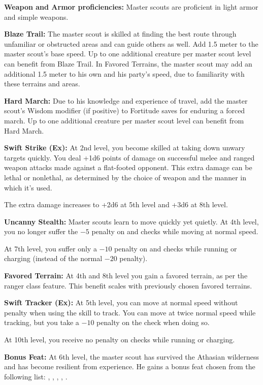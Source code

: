 {
\textbf{Weapon and Armor proficiencies:} Master scouts are proficient in light armor and simple weapons.

\textbf{Blaze Trail:} The master scout is skilled at finding the best route through unfamiliar or obstructed areas and can guide others as well. Add 1.5 meter to the master scout's base speed. Up to one additional creature per master scout level can benefit from Blaze Trail. In Favored Terrains, the master scout may add an additional 1.5 meter to his own and his party's speed, due to familiarity with these terrains and areas.

\textbf{Hard March:} Due to his knowledge and experience of travel, add the master scout's Wisdom modifier (if positive) to Fortitude saves for enduring a forced march. Up to one additional creature per master scout level can benefit from Hard March.

\textbf{Swift Strike (Ex):} At 2nd level, you become skilled at taking down unwary targets quickly. You deal +1d6 points of damage on successful melee and ranged weapon attacks made against a flat-footed opponent. This extra damage can be lethal or nonlethal, as determined by the choice of weapon and the manner in which it's used.

The extra damage increases to +2d6 at 5th level and +3d6 at 8th level.

\textbf{Uncanny Stealth:} Master scouts learn to move quickly yet quietly. At 4th level, you no longer suffer the $-5$ penalty on  and  checks while moving at normal speed.

At 7th level, you suffer only a $-10$ penalty on  and  checks while running or charging (instead of the normal $-20$ penalty).

\textbf{Favored Terrain:} At 4th and 8th level you gain a favored terrain, as per the ranger class feature. This benefit scales with previously chosen favored terrains.

\textbf{Swift Tracker (Ex):} At 5th level, you can move at normal speed without penalty when using the  skill to track. You can move at twice normal speed while tracking, but you take a $-10$ penalty on the check when doing so.

At 10th level, you receive no penalty on  checks while running or charging.

\textbf{Bonus Feat:} At 6th level, the master scout has survived the Athasian wilderness and has become resilient from experience. He gains a bonus feat chosen from the following list: , , , , .
}

